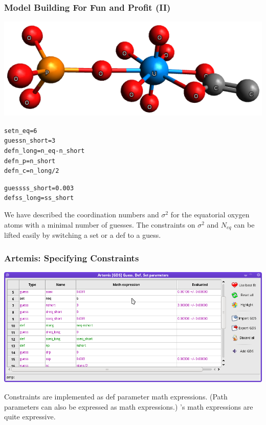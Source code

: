 \documentclass[10pt, xcolor=x11names, compress]{beamer}
\begin{document}
\begin{frame}[fragile]
  \frametitle{Model Building For Fun and Profit (II)}

  \begin{center}
    \quad\includegraphics[width=0.7\linewidth]{mfc/uranyl.png}
  \end{center}

  \begin{block}{}
    \begin{alltt}
    \scriptsize
     {\color{setp}set}      n\_eq     = 6
     {\color{guessp}guess}    n\_short  = 3
     {\color{defp}def}      n\_long   = n\_eq - n\_short
     {\color{defp}def}      n\_p      = n\_short
     {\color{defp}def}      n\_c      = n\_long / 2

     {\color{guessp}guess}    ss\_short = 0.003
     {\color{defp}def}      ss\_long  = ss\_short
    \end{alltt}
  \end{block}

  We have described the coordination numbers and $\sigma^2$ for the
  equatorial oxygen atoms with a minimal number of
  {\color{guessp}guess}es.  The constraints on $\sigma^2$ and
  $N_{eq}$ can be lifted easily by switching a {\color{setp}set} or
  a {\color{defp}def} to a {\color{guessp}guess}.
\end{frame}
  
\begin{frame}
  \frametitle{Artemis: Specifying Constraints}

  \begin{center}
    \includegraphics[width=\linewidth]{artemis/constraint.png}

    Constraints are implemented as {\color{defp}def} parameter math
    expressions.  (Path parameters can also be expressed as math
    expressions.)  {\artemis}'s math expressions are quite expressive.
  \end{center}
\end{frame}
\end{document}
